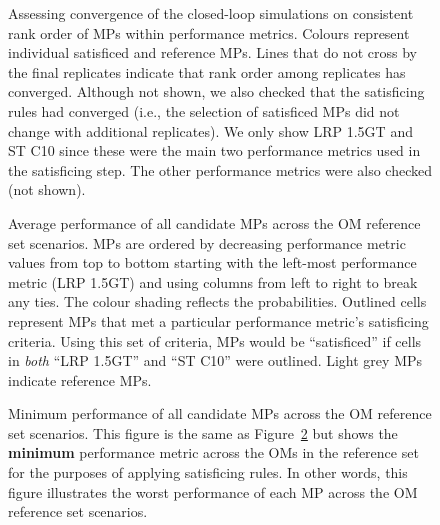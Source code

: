 \documentclass[11pt]{book}
\begin{document}
\begin{figure}[htb]

{\centering {} 

}

\caption{Assessing convergence of the closed-loop simulations on consistent rank order of MPs within performance metrics. Colours represent individual satisficed and reference MPs. Lines that do not cross by the final replicates indicate that rank order among replicates has converged. Although not shown, we also checked that the satisficing rules had converged (i.e., the selection of satisficed MPs did not change with additional replicates). We only show LRP 1.5GT and ST C10 since these were the main two performance metrics used in the satisficing step. The other performance metrics were also checked (not shown).}\label{fig:converge}
\end{figure}

\begin{figure}[htb]

{\centering {} 

}

\caption{Average performance of all candidate MPs across the OM reference set scenarios. MPs are ordered by decreasing performance metric values from top to bottom starting with the left-most performance metric (LRP 1.5GT) and using columns from left to right to break any ties. The colour shading reflects the probabilities. Outlined cells represent MPs that met a particular performance metric's satisficing criteria. Using this set of criteria, MPs would be ``satisficed'' if cells in \emph{both} ``LRP 1.5GT'' and ``ST C10'' were outlined. Light grey MPs indicate reference MPs.}\label{fig:tigure-avg}
\end{figure}

\begin{figure}[htb]

{\centering {} 

}

\caption{Minimum performance of all candidate MPs across the OM reference set scenarios. This figure is the same as Figure~\ref{fig:tigure-avg} but shows the \textbf{minimum} performance metric across the OMs in the reference set for the purposes of applying satisficing rules. In other words, this figure illustrates the worst performance of each MP across the OM reference set scenarios.}\label{fig:tigure-min}
\end{figure}
\clearpage
\end{document}
